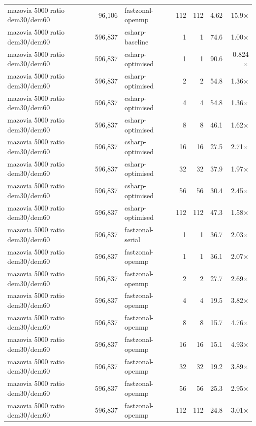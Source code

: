 \begin{tabular}{lrlrrrr}
mazovia 5000 ratio dem30/dem60 & 96,106 & fastzonal-openmp & 112 & 112 & 4.62 & 15.9$\times$ \\
mazovia 5000 ratio dem30/dem60 & 596,837 & csharp-baseline & 1 & 1 & 74.6 & 1.00$\times$ \\
mazovia 5000 ratio dem30/dem60 & 596,837 & csharp-optimised & 1 & 1 & 90.6 & 0.824$\times$ \\
mazovia 5000 ratio dem30/dem60 & 596,837 & csharp-optimised & 2 & 2 & 54.8 & 1.36$\times$ \\
mazovia 5000 ratio dem30/dem60 & 596,837 & csharp-optimised & 4 & 4 & 54.8 & 1.36$\times$ \\
mazovia 5000 ratio dem30/dem60 & 596,837 & csharp-optimised & 8 & 8 & 46.1 & 1.62$\times$ \\
mazovia 5000 ratio dem30/dem60 & 596,837 & csharp-optimised & 16 & 16 & 27.5 & 2.71$\times$ \\
mazovia 5000 ratio dem30/dem60 & 596,837 & csharp-optimised & 32 & 32 & 37.9 & 1.97$\times$ \\
mazovia 5000 ratio dem30/dem60 & 596,837 & csharp-optimised & 56 & 56 & 30.4 & 2.45$\times$ \\
mazovia 5000 ratio dem30/dem60 & 596,837 & csharp-optimised & 112 & 112 & 47.3 & 1.58$\times$ \\
mazovia 5000 ratio dem30/dem60 & 596,837 & fastzonal-serial & 1 & 1 & 36.7 & 2.03$\times$ \\
mazovia 5000 ratio dem30/dem60 & 596,837 & fastzonal-openmp & 1 & 1 & 36.1 & 2.07$\times$ \\
mazovia 5000 ratio dem30/dem60 & 596,837 & fastzonal-openmp & 2 & 2 & 27.7 & 2.69$\times$ \\
mazovia 5000 ratio dem30/dem60 & 596,837 & fastzonal-openmp & 4 & 4 & 19.5 & 3.82$\times$ \\
mazovia 5000 ratio dem30/dem60 & 596,837 & fastzonal-openmp & 8 & 8 & 15.7 & 4.76$\times$ \\
mazovia 5000 ratio dem30/dem60 & 596,837 & fastzonal-openmp & 16 & 16 & 15.1 & 4.93$\times$ \\
mazovia 5000 ratio dem30/dem60 & 596,837 & fastzonal-openmp & 32 & 32 & 19.2 & 3.89$\times$ \\
mazovia 5000 ratio dem30/dem60 & 596,837 & fastzonal-openmp & 56 & 56 & 25.3 & 2.95$\times$ \\
mazovia 5000 ratio dem30/dem60 & 596,837 & fastzonal-openmp & 112 & 112 & 24.8 & 3.01$\times$ \\
\bottomrule
\end{tabular}
